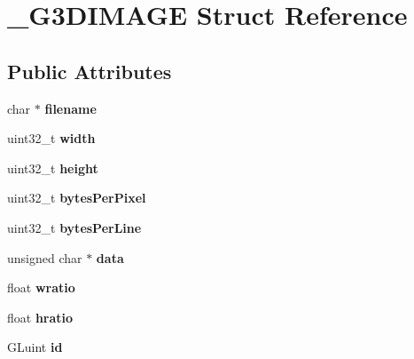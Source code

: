 \hypertarget{struct__G3DIMAGE}{}\section{\+\_\+\+G3\+D\+I\+M\+A\+GE Struct Reference}
\label{struct__G3DIMAGE}
\subsection*{Public Attributes}
\begin{DoxyCompactItemize}
\item 
\mbox{\label{struct__G3DIMAGE_a61128ca9f632101c39a13f551be6f9da}} 
char $\ast$ {\bfseries filename}
\item 
\mbox{\label{struct__G3DIMAGE_a9b61c83c2ff313cc6ee65565d03431cf}} 
uint32\+\_\+t {\bfseries width}
\item 
\mbox{\label{struct__G3DIMAGE_ae1070468960c1a6eb28ebb4b4e68127f}} 
uint32\+\_\+t {\bfseries height}
\item 
\mbox{\label{struct__G3DIMAGE_a82626a212833533eb48c2523f58711d7}} 
uint32\+\_\+t {\bfseries bytes\+Per\+Pixel}
\item 
\mbox{\label{struct__G3DIMAGE_aaa7bf0fbed858bba447a2dd509d49a06}} 
uint32\+\_\+t {\bfseries bytes\+Per\+Line}
\item 
\mbox{\label{struct__G3DIMAGE_aecf79af244262b0b9c58f11dc0364b29}} 
unsigned char $\ast$ {\bfseries data}
\item 
\mbox{\label{struct__G3DIMAGE_a168f9a3cc217648c111d171732b7d77d}} 
float {\bfseries wratio}
\item 
\mbox{\label{struct__G3DIMAGE_a2659120d93aec9121ec3f7e5fe793ba1}} 
float {\bfseries hratio}
\item 
\mbox{\label{struct__G3DIMAGE_af747756dd8929c895fa77720f872df54}} 
G\+Luint {\bfseries id}
\item 
\mbox{\label{struct__G3DIMAGE_aef549c11ccf6026b710fb77ae81d74be}} 

\end{DoxyCompactItemize}

